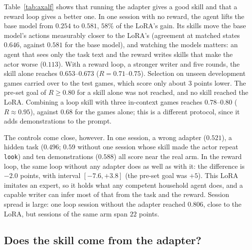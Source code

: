 \documentclass[11pt]{article}
\begin{document}
Table~\ref{tab:axalf} shows that running the adapter gives a good skill and that a reward loop gives a better one. In one session with no reward, the agent lifts
the base model from $0.254$ to $0.581$, $58\%$ of the LoRA's gain. Its skills move the base model's actions measurably closer to the LoRA's (agreement
at matched states $0.646$, against $0.581$ for the base model), and watching the models matters: an agent that sees only the task text and the reward
writes skills that make the actor worse ($0.113$). With a reward loop, a stronger writer and five rounds, the skill alone reaches $0.653$--$0.673$
($R=0.71$--$0.75$). Selection on unseen development games carried over to the test games, which score only about $3$ points lower.
The pre-set goal of $R\ge0.80$ for a skill alone was not reached, and no skill reached the LoRA. Combining a loop skill with three in-context
games reaches $0.78$--$0.80$ ($R\approx0.95$), against $0.68$ for the games alone; this is a different protocol, since it adds demonstrations to the prompt.

The controls come close, however. In one session, a wrong adapter ($0.521$), a hidden task ($0.496$; $0.59$ without one session whose skill made the
actor repeat \texttt{look}) and ten demonstrations ($0.588$) all score near the real arm. In the reward loop, the same loop without any adapter does
as well as with it: the difference is $-2.0$ points, with interval $[-7.6,+3.8]$ (the pre-set goal was $+5$). This LoRA imitates an expert, so it holds
what any competent household agent does, and a capable writer can infer most of that from the task and the reward. Session spread is large: one
loop session without the adapter reached $0.806$, close to the LoRA, but sessions of the same arm span $22$ points.

\subsection{Does the skill come from the adapter?}
\label{sec:ax-dep}
\end{document}
